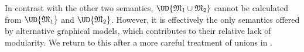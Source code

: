\documentclass{article}
\theoremstyle{plain}
\theoremstyle{definition}
\theoremstyle{remark}
\newtheorem*{remark}{Remark}
\newcommand{\commentout}[1]{\ignorespaces}
\newcommand{\dg}[1]{\mathfrak{#1}}
\newcommand\Gib{\mathit{Gib}}
\numberwithin{equation}{section}
\begin{document}
\commentout{        
	\begin{remark}
		If $\dg M$ is a consistent PDG, then 
		$\bbr{\dg M}'_* = \bbr{\dg M}_*$
	 	where $\bbr{\dg M}'_*$ is the variant of \eqref{eq:uniqdist} which uses the alternate formulation $\Gib'$ of the extra information in place of $\Gib$.
	\end{remark}
}


\begin{vleftovers}

      In contrast with the other two semantics, $\UD{\dg M_1 \cup
          \dg M_2}$ cannot be calculated from $\UD{\dg M_1}$ and
        $\UD{\dg M_2}$. However, it is effectively the only semantics
        offered by alternative graphical models, which contributes to
        their relative lack of modularity. We return to this after a
        more careful treatment of unions in
        .
\end{vleftovers}
        
\end{document}
